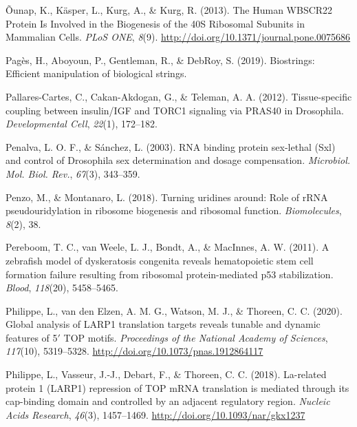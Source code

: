 \documentclass[12pt,twoside]{reedthesis}
\newlength{\cslhangindent}
\newenvironment{cslreferences}%
  {\setlength{\parindent}{0pt}%
  \everypar{\setlength{\hangindent}{\cslhangindent}}\ignorespaces}%
  {\par}
\begin{document}
\begin{cslreferences}
\leavevmode\hypertarget{ref-ounapHumanWBSCR22Protein2013}{}%
Õunap, K., Käsper, L., Kurg, A., \& Kurg, R. (2013). The Human WBSCR22 Protein Is Involved in the Biogenesis of the 40S Ribosomal Subunits in Mammalian Cells. \emph{PLoS ONE}, \emph{8}(9). \url{http://doi.org/10.1371/journal.pone.0075686}

\leavevmode\hypertarget{ref-pagesBiostringsEfficientManipulation2019}{}%
Pagès, H., Aboyoun, P., Gentleman, R., \& DebRoy, S. (2019). Biostrings: Efficient manipulation of biological strings.

\leavevmode\hypertarget{ref-Pallares-Cartes2012a}{}%
Pallares-Cartes, C., Cakan-Akdogan, G., \& Teleman, A. A. (2012). Tissue-specific coupling between insulin/IGF and TORC1 signaling via PRAS40 in Drosophila. \emph{Developmental Cell}, \emph{22}(1), 172--182.

\leavevmode\hypertarget{ref-Penalva2003}{}%
Penalva, L. O. F., \& Sánchez, L. (2003). RNA binding protein sex-lethal (Sxl) and control of Drosophila sex determination and dosage compensation. \emph{Microbiol. Mol. Biol. Rev.}, \emph{67}(3), 343--359.

\leavevmode\hypertarget{ref-Penzo2018}{}%
Penzo, M., \& Montanaro, L. (2018). Turning uridines around: Role of rRNA pseudouridylation in ribosome biogenesis and ribosomal function. \emph{Biomolecules}, \emph{8}(2), 38.

\leavevmode\hypertarget{ref-Pereboom2011a}{}%
Pereboom, T. C., van Weele, L. J., Bondt, A., \& MacInnes, A. W. (2011). A zebrafish model of dyskeratosis congenita reveals hematopoietic stem cell formation failure resulting from ribosomal protein-mediated p53 stabilization. \emph{Blood}, \emph{118}(20), 5458--5465.

\leavevmode\hypertarget{ref-philippeGlobalAnalysisLARP12020}{}%
Philippe, L., van den Elzen, A. M. G., Watson, M. J., \& Thoreen, C. C. (2020). Global analysis of LARP1 translation targets reveals tunable and dynamic features of 5\({'}\) TOP motifs. \emph{Proceedings of the National Academy of Sciences}, \emph{117}(10), 5319--5328. \url{http://doi.org/10.1073/pnas.1912864117}

\leavevmode\hypertarget{ref-philippeLarelatedProteinLARP12018}{}%
Philippe, L., Vasseur, J.-J., Debart, F., \& Thoreen, C. C. (2018). La-related protein 1 (LARP1) repression of TOP mRNA translation is mediated through its cap-binding domain and controlled by an adjacent regulatory region. \emph{Nucleic Acids Research}, \emph{46}(3), 1457--1469. \url{http://doi.org/10.1093/nar/gkx1237}


\end{cslreferences}
\end{document}
